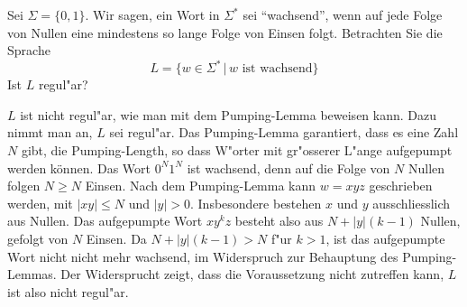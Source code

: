 Sei $\Sigma=\{0,1\}$.
Wir sagen, ein Wort in $\Sigma^*$ sei ``wachsend'',
wenn auf jede Folge von Nullen eine mindestens
so lange Folge von Einsen folgt.
Betrachten Sie die Sprache
\[
L=\{
w\in \Sigma^*\,|\, \text{$w$ ist wachsend}
\}
\]
Ist $L$ regul"ar?

\begin{loesung}
$L$ ist nicht regul"ar, wie man mit dem Pumping-Lemma beweisen kann.
Dazu nimmt man an, $L$ sei regul"ar. Das Pumping-Lemma garantiert, dass
es eine Zahl $N$ gibt, die Pumping-Length, so dass W"orter mit gr"osserer
L"ange aufgepumpt werden können. Das Wort $0^N1^N$ ist wachsend, denn
auf die Folge von $N$ Nullen folgen $N\ge N$ Einsen. Nach dem Pumping-Lemma
kann $w=xyz$ geschrieben werden, mit $|xy|\le N$ und $|y|>0$. Insbesondere bestehen
$x$ und $y$ ausschliesslich aus Nullen. Das aufgepumpte Wort
$xy^kz$ besteht also aus $N+|y|(k-1)$ Nullen, gefolgt von $N$ Einsen.
Da $N+|y|(k-1) > N$ f"ur $k>1$, ist das aufgepumpte Wort nicht nicht
mehr wachsend, im Widerspruch zur Behauptung des Pumping-Lemmas. Der
Widersprucht zeigt, dass die Voraussetzung nicht zutreffen kann, $L$
ist also nicht regul"ar.
\end{loesung}
